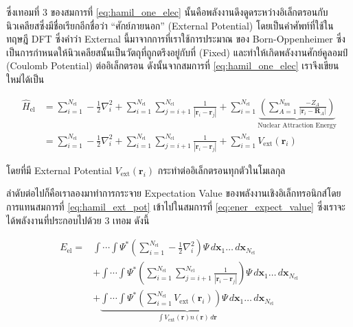 \noindent ซึ่งเทอมที่ 3 ของสมการที่ \eqref{eq:hamil_one_elec} นั้นคือพลังงานดึงดูดระหว่างอิเล็กตรอนกับนิวเคลียสซึ่งมีชื่อเรียกอีกชื่อว่า
\enquote{ศักย์ภายนอก} (External Potential) โดยเป็นคำศัพท์ที่ใช้ในทฤษฎี DFT ซึ่งคำว่า External นี้มาจากการที่เราใช้การประมาณ%
ของ Born-Oppenheimer ซึ่งเป็นการกำหนดให้นิวเคลียสนั้นเป็นวัตถุที่ถูกตรึงอยู่กับที่ (Fixed) และทำให้เกิดพลังงานศักย์คูลอมป์ (Coulomb
Potential) ต่ออิเล็กตรอน ดังนั้นจากสมการที่ \eqref{eq:hamil_one_elec} เราจึงเขียนใหม่ได้เป็น

\begin{align}\label{eq:hamil_ext_pot}
    \hat{H}_{\text{el}} & = \sum^{N_{\text{el}}}_{i=1} -\frac{1}{2} \nabla^{2}_{i}
    + \sum^{N_{\text{el}}}_{i=1} \sum^{N_{\text{el}}}_{j=i+1} \frac{1}{|\bm{r}_{i}-\bm{r}_{j}|}
    + \sum^{N_{\text{el}}}_{i=1}
    \underbrace{\left ( \sum^{N_{\text{nu}}}_{A=1} \frac{-Z_{A}}{|\bm{r}_{i}-\bm{R}_{A}|} \right )}%
    _{\text{Nuclear Attraction Energy}} \nonumber                                  \\
                        & = \sum^{N_{\text{el}}}_{i=1} -\frac{1}{2} \nabla^{2}_{i}
    + \sum^{N_{\text{el}}}_{i=1} \sum^{N_{\text{el}}}_{j=i+1} \frac{1}{|\bm{r}_{i}-\bm{r}_{j}|}
    + \sum^{N_{\text{el}}}_{i=1} V_{\text{ext}}(\bm{r}_{i})
\end{align}

\noindent โดยที่มี External Potential $V_{\text{ext}}(\bm{r}_{i})$ กระทำต่ออิเล็กตรอนทุกตัวในโมเลกุล

ลำดับต่อไปก็คือเราลองมาทำการกระจาย Expectation Value ของพลังงานเชิงอิเล็กทรอนิกส์โดยการแทนสมการที่ \eqref{eq:hamil_ext_pot}
เข้าไปในสมการที่ \eqref{eq:ener_expect_value} ซึ่งเราจะได้พลังงานที่ประกอบไปด้วย 3 เทอม ดังนี้

\begin{align}\label{eq:ener_express_ext_pot}
    E_{\text{el}} = & \int \cdots \int \Psi^{\ast}
    \left ( \sum^{N_{\text{el}}}_{i=1} -\frac{1}{2} \nabla^{2}_{i} \right )
    \Psi \, d\bm{x}_{1} \dots \, d\bm{x}_{N_{\text{el}}} \nonumber \\
                    & + \int \cdots \int \Psi^{\ast}
    \left ( \sum^{N_{\text{el}}}_{i=1} \sum^{N_{\text{el}}}_{j=i+1} \frac{1}{|\bm{r}_{i}-\bm{r}_{j}|} \right )
    \Psi \, d\bm{x}_{1} \dots \, d\bm{x}_{N_{\text{el}}} \nonumber \\
                    & + \underbrace{\int \cdots \int \Psi^{\ast}
    \left ( \sum^{N_{\text{el}}}_{i=1} V_{\text{ext}}(\bm{r}_{i}) \right )
    \Psi \, d\bm{x}_{1} \dots \, d\bm{x}_{N_{\text{el}}}%
    }_{\textstyle \int V_{\text{ext}}(\bm{r}) n(\bm{r}) \, d\bm{r}}
\end{align}

